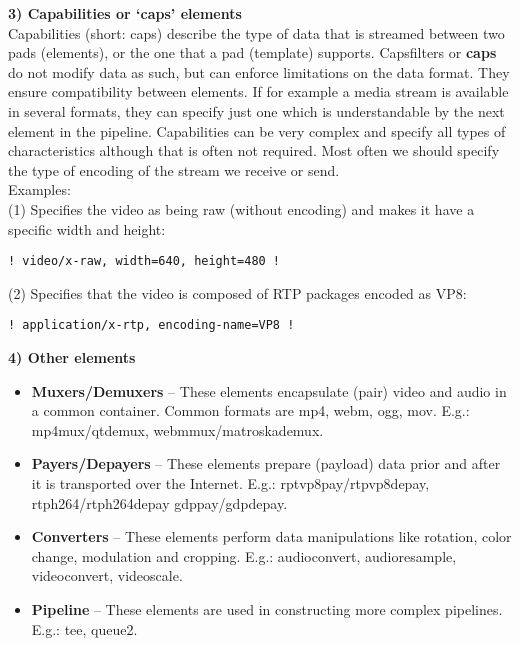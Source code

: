 \textbf{3) Capabilities or ‘caps’ elements}\\
Capabilities (short: caps) describe the type of data that is streamed between two pads (elements), or the one that a pad (template) supports. Capsfilters or \textbf{caps} do not modify data as such, but can enforce limitations on the data format. They ensure compatibility between elements. If for example a media stream is available in several formats, they can specify just one which is understandable by the next element in the pipeline. Capabilities can be very complex and specify all types of characteristics although that is often not required. Most often we should specify the type of encoding of the stream we receive or send.
\\
Examples:
\\
(1) Specifies the video as being raw (without encoding) and makes it have a specific width and height:
\begin{verbatim}
! video/x-raw, width=640, height=480 !
\end{verbatim}
(2) Specifies that the video is composed of RTP packages encoded as VP8:
\begin{verbatim}
! application/x-rtp, encoding-name=VP8 !
\end{verbatim}

\textbf{4) Other elements}
\begin{itemize}

\item  \textbf{Muxers/Demuxers} – These elements encapsulate (pair) video and audio in a common container. Common formats are mp4, webm, ogg, mov.
E.g.:  mp4mux/qtdemux, webmmux/matroskademux.

\item    \textbf{Payers/Depayers} – These elements prepare (payload) data prior and after it is transported over the Internet.
E.g.: rptvp8pay/rtpvp8depay,  rtph264/rtph264depay gdppay/gdpdepay.

\item    \textbf{Converters} – These elements perform data manipulations like rotation, color change, modulation and cropping.
E.g.: audioconvert, audioresample, videoconvert, videoscale.

\item    \textbf{Pipeline} – These elements are used in constructing more complex pipelines.
E.g.: tee, queue2.

\end{itemize}


